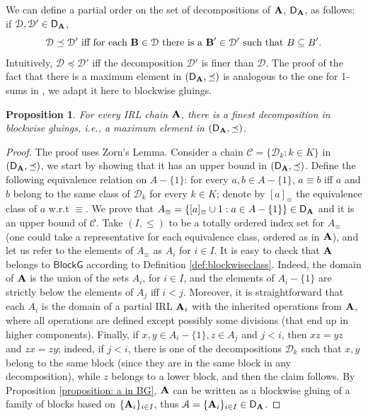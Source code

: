 \documentclass{amsart}
\newtheorem{proposition}[theorem]{Proposition}
\theoremstyle{definition}
\numberwithin{equation}{section}
\newcommand{\alg}[1]{{\textbf{\upshape #1}}}  %
\newcommand{\vv}[1]{\mathsf {#1}}
\newcommand{\sse}{\subseteq}
\newcommand{\cc}[1]{\mathcal{#1}}
\newcommand{\BlG}{\vv{BlockG}}
\begin{document}
We can define a partial order on the set of decompositions of $\alg A$, $\vv{D}_{\alg A}$, as follows: if $\cc D, \cc D' \in \vv{D}_{\alg A}$, $$\cc D \preceq \cc D' \mbox{ iff for each } \alg B \in \cc D  \mbox{ there is a } \alg B' \in \cc D' \mbox{ such that } B \sse B'.$$
Intuitively, $\cc D \preceq \cc D'$ iff the decomposition $\cc D'$ is finer than $\cc D$. The proof of the fact that there is a maximum element in $(\vv{D}_{\alg A}, \preceq)$ is analogous to the one for 1-sums in \cite[Theorem 14]{Montagnaetal2006}, we adapt it here to blockwise gluings.
\begin{proposition}
	For every IRL chain $\alg A$, there is a finest decomposition in blockwise gluings, i.e., a maximum element in $(\vv{D}_{\alg A}, \preceq)$.
\end{proposition}
\begin{proof}
The proof uses Zorn's Lemma. Consider a chain $\mathscr{C} = \{\cc D_k : k \in  K\}$ in $(\vv{D}_{\alg A}, \preceq)$, we start by showing that it has an upper bound in $(\vv{D}_{\alg A}, \preceq)$. 
Define the following equivalence relation on $A-\{1\}$: for every $a,b \in  A-\{1\}$, $a \equiv b$ iff $a$ and $b$ belong to the same class of $\cc D_k$ for every $k \in  K$; denote by $[a]_\equiv$ the equivalence class of $a$ w.r.t $\equiv$. We prove that $A_\equiv = \{[a]_\equiv \cup 1: a \in A-\{1\}\} \in \vv{D}_{\alg A}$ and it is an upper bound of $\mathscr{C}$. Take $(I, \leq)$ to be a totally ordered index set for $A_\equiv$ (one could take a representative for each equivalence class, ordered as in $\alg A$), and let us refer to the elements of $A_\equiv$ as $A_i$ for $i \in I$. It is easy to check that $\alg A$ belongs to $\BlG$ according to Definition \ref{def:blockwiseclass}. Indeed, the domain of $\alg A$ is the union of the sets $A_i$, for $i \in I$, and the elements of $A_i- \{1\}$ are strictly below the elements of $A_j$ iff $i < j$. Moreover, it is straightforward that each $A_i$ is the domain of a partial IRL $\alg A_i$ with the inherited operations from $\alg A$, where all operations are defined except possibly some divisions (that end up in higher components).
	Finally, if $x, y \in A_i- \{1\}, z \in A_j$ and $j < i$, then $xz = yz$ and $zx = zy$; indeed, if $j < i$, there is one of the decompositions $\cc D_k$ such that $x,y$ belong to the same block (since they are in the same block in any decomposition), while $z$ belongs to a lower block, and then the claim follows. By Proposition \ref{proposition: a in BG}, $\alg A$ can be written as a blockwise gluing of a family of blocks based on  $\{\alg A_i\}_{i \in I}$, thus $\cc A = \{\alg A_i\}_{i \in I} \in \vv{D}_{\alg A}$.


\end{proof}
\end{document}

